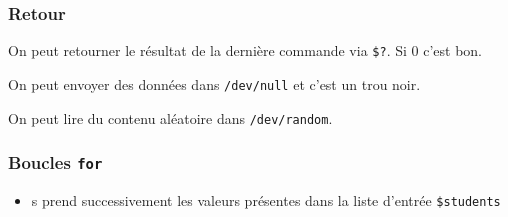 \begin{Shaded}
\begin{Highlighting}[]
  \VariableTok{$\#}  
  
  
\end{Highlighting}
\end{Shaded}

\subsubsection{Retour}\label{retour}

On peut retourner le résultat de la dernière commande via \texttt{\$?}.
Si 0 c'est bon.

On peut envoyer des données dans \texttt{/dev/null} et c'est un trou
noir.

On peut lire du contenu aléatoire dans \texttt{/dev/random}.

\subsubsection{\texorpdfstring{Boucles
\texttt{for}}{Boucles for}}\label{boucles-for}

\begin{Shaded}
\begin{Highlighting}[]
\OperatorTok{=} 
 \KeywordTok{;}  
  \OperatorTok{=}\KeywordTok{\textasciigrave{}} \KeywordTok{|}  \StringTok{\textquotesingle{} \textquotesingle{}} \KeywordTok{\textasciigrave{}} 
   
\end{Highlighting}
\end{Shaded}

\begin{itemize}
\tightlist
\item
  s prend successivement les valeurs présentes dans la liste d'entrée
  \texttt{\$students}
\end{itemize}

